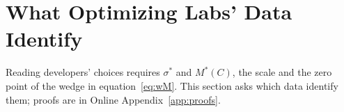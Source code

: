 
\providecommand{\E}{\mathbb{E}}
\makeatletter
\providecommand{\identpartlabel}[2]{\protected@edef\@currentlabel{\theproposition#1}\label{#2}}
\makeatother

\section{What Optimizing Labs' Data Identify}\label{sec:ident}

Reading developers' choices requires $\sigma^*$ and $M^*(C)$, the scale and the zero point of the wedge in
equation~\eqref{eq:wM}. This section asks which data identify them; proofs
are in Online Appendix~\ref{app:proofs}.

